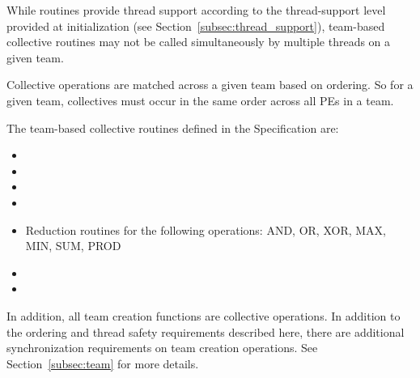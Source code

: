 While \openshmem routines provide thread support according to the
thread-support level provided at initialization (see
Section~\ref{subsec:thread_support}), team-based collective routines
may not be called simultaneously by multiple threads on a given team.

Collective operations are matched across a given team based on ordering. So for a given team,
collectives must occur in the same order across all PEs in a team.

The team-based collective routines defined in the \openshmem Specification are:

\begin{itemize}
\item {}
\item {}
\item {}
\item {}
\item Reduction routines for the following operations: AND, OR, XOR, MAX, MIN, SUM, PROD
\item {}
\item {}
\end{itemize}

In addition, all team creation functions are collective operations. In addition to the ordering
and thread safety requirements described here, there are additional synchronization requirements
on team creation operations. See Section~\ref{subsec:team} for more details.

